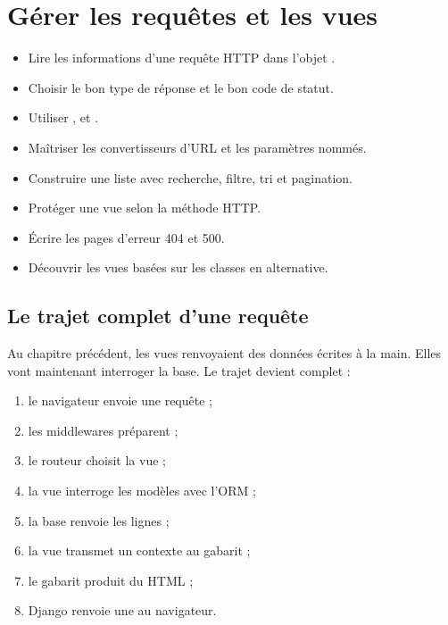 \chapter{Gérer les requêtes et les vues}
\label{ch:requetes}


\begin{objectifs}
\begin{itemize}
  \item Lire les informations d'une requête HTTP dans l'objet .
  \item Choisir le bon type de réponse et le bon code de statut.
  \item Utiliser ,  et
        .
  \item Maîtriser les convertisseurs d'URL et les paramètres nommés.
  \item Construire une liste avec recherche, filtre, tri et pagination.
  \item Protéger une vue selon la méthode HTTP.
  \item Écrire les pages d'erreur 404 et 500.
  \item Découvrir les vues basées sur les classes en alternative.
\end{itemize}
\end{objectifs}

\section{Le trajet complet d'une requête}

Au chapitre précédent, les vues renvoyaient des données écrites à la main. Elles
vont maintenant interroger la base. Le trajet devient complet :

\begin{enumerate}
  \item le navigateur envoie une requête  ;
  \item les middlewares préparent  ;
  \item le routeur choisit la vue  ;
  \item la vue interroge les modèles avec l'ORM ;
  \item la base renvoie les lignes ;
  \item la vue transmet un contexte au gabarit ;
  \item le gabarit produit du HTML ;
  \item Django renvoie une  au navigateur.
\end{enumerate}

